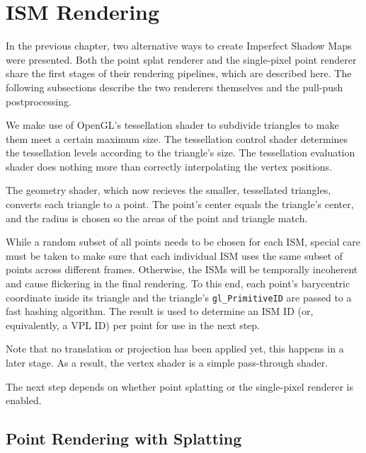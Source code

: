 
\section{ISM Rendering}
\label{sec:impl:ismRendering}

In the previous chapter, two alternative ways to create Imperfect Shadow Maps were presented. Both the point splat renderer and the single-pixel point renderer share the first stages of their rendering pipelines, which are described here. The following subsections describe the two renderers themselves and the pull-push postprocessing.

We make use of OpenGL's tessellation shader to subdivide triangles to make them meet a certain maximum size. The tessellation control shader determines the tessellation levels according to the triangle's size. The tessellation evaluation shader does nothing more than correctly interpolating the vertex positions.

The geometry shader, which now recieves the smaller, tessellated triangles, converts each triangle to a point. The point's center equals the triangle's center, and the radius is chosen so the areas of the point and triangle match.


While a random subset of all points needs to be chosen for each ISM, special care must be taken to make sure that each individual ISM uses the same subset of points across different frames. Otherwise, the ISMs will be temporally incoherent and cause flickering in the final rendering. To this end, each point's barycentric coordinate inside its triangle and the triangle's \texttt{gl\_PrimitiveID} are passed to a fast hashing algorithm. The result is used to determine an ISM ID (or, equivalently, a VPL ID) per point for use in the next step.

Note that no translation or projection has been applied yet, this happens in a later stage. As a result, the vertex shader is a simple pass-through shader.

The next step depends on whether point splatting or the single-pixel renderer is enabled.



\subsection{Point Rendering with Splatting}
\label{sec:impl:splatting}


